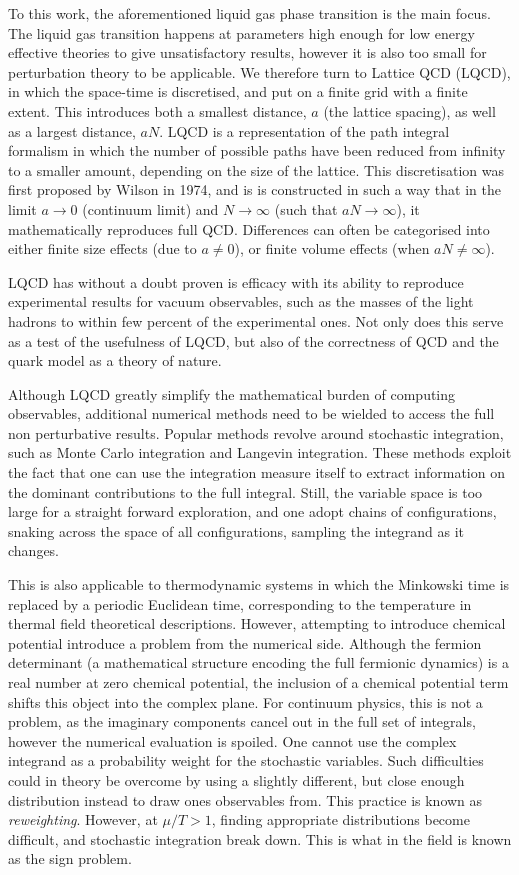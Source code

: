 {To this work, the aforementioned liquid gas phase transition is the main focus.
The liquid gas transition happens at parameters high enough for low energy
effective theories to give unsatisfactory results, however it is also too small
for perturbation theory to be applicable. We therefore turn to Lattice QCD
(LQCD), in which the space-time is discretised, and put on a finite grid with a
finite extent. This introduces both a smallest distance, $a$ (the lattice
spacing), as well as a largest distance, $a N$. LQCD is a representation of the
path integral formalism in which the number of possible paths have been reduced
from infinity to a smaller amount, depending on the size of the lattice.  This
discretisation was first proposed by Wilson in 1974, and is is constructed in
such a way that in the limit $a \to 0$ (continuum limit) and $N \to \infty$
(such that $a N \to \infty$), it mathematically reproduces full QCD. Differences
can often be categorised into either finite size effects (due to $a \neq 0$), or
finite volume effects (when $a N \neq \infty$). 

LQCD  has without a doubt proven is efficacy with its ability to reproduce
experimental results for vacuum observables, such as the masses of the light
hadrons to within few percent of the experimental ones. Not only does this serve
as a test of the usefulness of LQCD, but also of the correctness of QCD and the
quark model as a theory of nature.

Although LQCD greatly simplify the mathematical burden of computing observables,
additional numerical methods need to be wielded to access the full
non perturbative results. Popular methods revolve around stochastic integration,
such as Monte Carlo integration and Langevin integration. These methods exploit
the fact that one can use the integration measure itself to extract
information on the dominant contributions to the full integral. Still, the
variable space is too large for a straight forward exploration, and one adopt
chains of configurations, snaking across the space of all configurations,
sampling the integrand as it changes.

This is also applicable to thermodynamic systems in which the Minkowski time is
replaced by a periodic Euclidean time, corresponding to the temperature in
thermal field theoretical descriptions. However, attempting to introduce
chemical potential introduce a problem from the numerical side. Although the
fermion determinant (a mathematical structure encoding the full fermionic
dynamics) is a real number at zero chemical potential, the inclusion of a
chemical potential term shifts this object into the complex plane. For continuum
physics, this is not a problem, as the imaginary components cancel out in the
full set of integrals, however the numerical evaluation is spoiled. One cannot
use the complex integrand as a probability weight for the stochastic variables.
Such difficulties could in theory be overcome by using a slightly different, but
close enough distribution instead to draw ones observables from. This practice
is known as \emph{reweighting}. However, at $\mu / T > 1$, finding appropriate
distributions become difficult, and stochastic integration break down. This is
what in the field is known as the sign problem.

}
